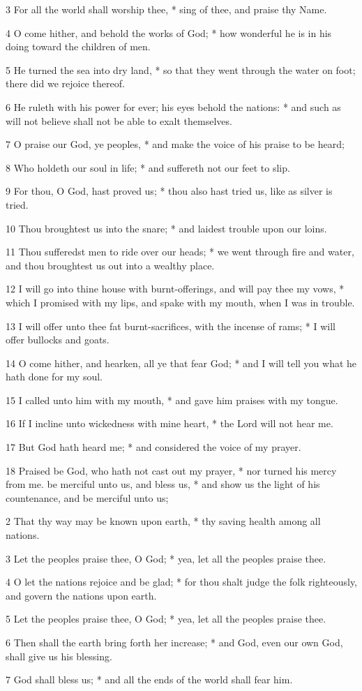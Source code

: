 3 For all the world shall worship thee, * sing of thee, and praise thy Name.\par
4 O come hither, and behold the works of God; * how wonderful he is in his doing toward the children of men.\par
5 He turned the sea into dry land, * so that they went through the water on foot; there did we rejoice thereof.\par
6 He ruleth with his power for ever; his eyes behold the nations: * and such as will not believe shall not be able to exalt themselves.\par
7 O praise our God, ye peoples, * and make the voice of his praise to be heard;\par
8 Who holdeth our soul in life; * and suffereth not our feet to slip.\par
9 For thou, O God, hast proved us; * thou also hast tried us, like as silver is tried.\par
10 Thou broughtest us into the snare; * and laidest trouble upon our loins.\par
11 Thou sufferedst men to ride over our heads; * we went through fire and water, and thou broughtest us out into a wealthy place.\par
12 I will go into thine house with burnt-offerings, and will pay thee my vows, * which I promised with my lips, and spake with my mouth, when I was in trouble.\par
13 I will offer unto thee fat burnt-sacrifices, with the incense of rams; * I will offer bullocks and goats.\par
14 O come hither, and hearken, all ye that fear God; * and I will tell you what he hath done for my soul.\par
15 I called unto him with my mouth, * and gave him praises with my tongue.\par
16 If I incline unto wickedness with mine heart, * the Lord will not hear me.\par
17 But God hath heard me; * and considered the voice of my prayer.\par
18 Praised be God, who hath not cast out my prayer, * nor turned his mercy from me.
 be merciful unto us, and bless us, * and show us the light of his countenance, and be merciful unto us;\par
2 That thy way may be known upon earth, * thy saving health among all nations.\par
3 Let the peoples praise thee, O God; * yea, let all the peoples praise thee.\par
4 O let the nations rejoice and be glad; * for thou shalt judge the folk righteously, and govern the nations upon earth.\par
5 Let the peoples praise thee, O God; * yea, let all the peoples praise thee.\par
6 Then shall the earth bring forth her increase; * and God, even our own God, shall give us his blessing.\par
7 God shall bless us; * and all the ends of the world shall fear him.
